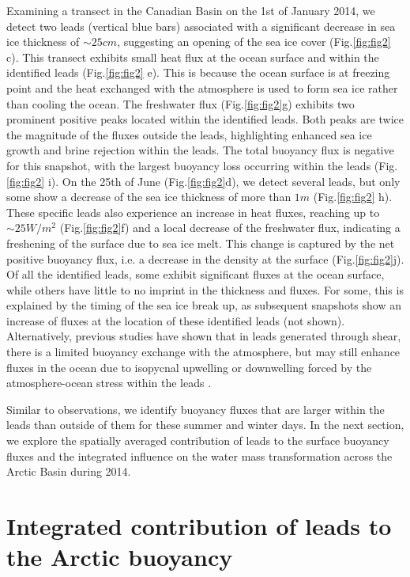 \documentclass[draft]{agujournal2019}
\begin{document}
Examining a transect in the Canadian Basin on the 1st of January 2014, we detect two leads (vertical blue bars) associated with a significant decrease in sea ice thickness of $\sim 25cm$, suggesting an opening of the sea ice cover (Fig.\ref{fig:fig2} c).
This transect exhibits small heat flux at the ocean surface and within the identified leads (Fig.\ref{fig:fig2} e). This is because the ocean surface is at freezing point and the heat exchanged with the atmosphere is used to form sea ice rather than cooling the ocean.
The freshwater flux (Fig.\ref{fig:fig2}g) exhibits two prominent positive peaks located within the identified leads. Both peaks are twice the magnitude of the fluxes outside the leads, highlighting enhanced sea ice growth and brine rejection within the leads. 
The total buoyancy flux is negative for this snapshot, with the largest buoyancy loss occurring within the leads (Fig.\ref{fig:fig2} i).
On the 25th of June (Fig.\ref{fig:fig2}d), we detect several leads, but only some show a decrease of the sea ice thickness of more than $1m$ (Fig.\ref{fig:fig2} h). These specific leads also experience an increase in heat fluxes, reaching up to $\sim 25 W/m^2$ (Fig.\ref{fig:fig2}f) and a local decrease of the freshwater flux, indicating a freshening of the surface due to sea ice melt. This change is captured by the net positive buoyancy flux, i.e. a decrease in the density at the surface (Fig.\ref{fig:fig2}j).
Of all the identified leads, some exhibit significant fluxes at the ocean surface, while others have little to no imprint in the thickness and fluxes. For some, this is explained by the timing of the sea ice break up, as subsequent snapshots show an increase of fluxes at the location of these identified leads (not shown). Alternatively, previous studies have shown that in leads generated through shear, there is a limited buoyancy exchange with the atmosphere, but may still enhance fluxes in the ocean due to isopycnal upwelling or downwelling forced by the atmosphere-ocean stress within the leads \cite{Bourgault_flux_lkf_2020}.

Similar to observations, we identify buoyancy fluxes that are larger within the leads than outside of them for these summer and winter days. In the next section, we explore the spatially averaged contribution of leads to the surface buoyancy fluxes and the integrated influence on the water mass transformation across the Arctic Basin during 2014. 

\section{Integrated contribution of leads to the Arctic buoyancy}\label{sec3}
\end{document}

